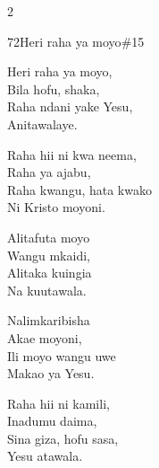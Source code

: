 \begin{multicols}{2}
\begin{hymn}{72}{Heri raha ya moyo}{\#15}
\begin{stanza}
Heri raha ya moyo,\\
Bila hofu, shaka,\\
Raha ndani yake Yesu,\\
Anitawalaye.
\end{stanza}
\begin{stanza}
Raha hii ni kwa neema,\\
Raha ya ajabu,\\
Raha kwangu, hata kwako\\
Ni Kristo moyoni.
\end{stanza}
\begin{stanza}
Alitafuta moyo\\
Wangu mkaidi,\\
Alitaka kuingia\\
Na kuutawala.
\end{stanza}
\begin{stanza}
Nalimkaribisha\\
Akae moyoni,\\
Ili moyo wangu uwe\\
Makao ya Yesu.
\end{stanza}
\begin{stanza}
Raha hii ni kamili,\\
Inadumu daima,\\
Sina giza, hofu sasa,\\
Yesu atawala.
\end{stanza}
\end{hymn}


\end{multicols}
